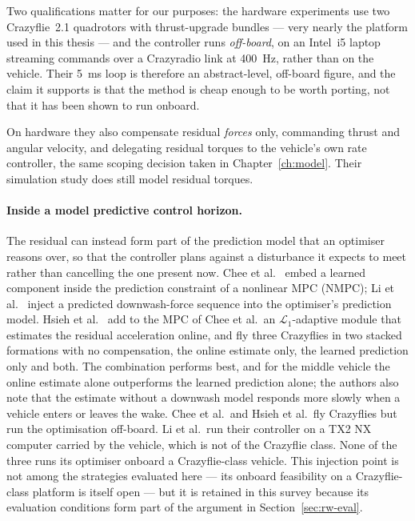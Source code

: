 Two qualifications matter for our purposes: the hardware
experiments use two Crazyflie~2.1 quadrotors with thrust-upgrade bundles --- very nearly the
platform used in this thesis --- and the controller runs \emph{off-board}, on an Intel~i5 laptop
streaming commands over a Crazyradio link at \SI{400}{\hertz}, rather than on the vehicle. Their
\SI{5}{\milli\second} loop is therefore an abstract-level, off-board figure, and the claim it
supports is that the method is cheap enough to be worth porting, not that it has been shown to run
onboard.

On hardware they also compensate residual \emph{forces} only, commanding thrust and angular
velocity, and delegating residual torques to the vehicle's own rate controller, the same scoping
decision taken in Chapter~\ref{ch:model}. Their simulation study does still model residual torques.

\paragraph{Inside a model predictive control horizon.}
The residual can instead form part of the prediction model that an optimiser reasons over, so that
the controller plans against a disturbance it expects to meet rather than cancelling the one
present now. Chee et al.~\cite{chee2024knodedwmpc} embed a learned component inside the prediction
constraint of a nonlinear MPC (NMPC); Li et al.~\cite{li2023ndpnmpc} inject a predicted downwash-force
sequence into the optimiser's prediction model. Hsieh et al.~\cite{hsieh2025onlineadaptation} add to
the MPC of Chee et al.\ an $\mathcal{L}_1$-adaptive module that estimates the residual acceleration
online, and fly three Crazyflies in two stacked formations with no compensation, the online
estimate only, the learned prediction only and both. The combination performs best, and for the
middle vehicle the online estimate alone outperforms the learned prediction alone; the authors
also note that the estimate without a downwash model responds more slowly when a vehicle enters or
leaves the wake. Chee et al.\ and Hsieh et al.\ fly Crazyflies but run the
optimisation off-board. Li et al.\ run their controller on a TX2 NX
computer carried by the vehicle, which is not of the Crazyflie class. None of the three runs its
optimiser onboard a Crazyflie-class vehicle. This injection point is not among
the strategies evaluated here --- its onboard feasibility on a Crazyflie-class platform is itself
open --- but it is retained in this survey because its evaluation conditions form part of the
argument in Section~\ref{sec:rw-eval}.


